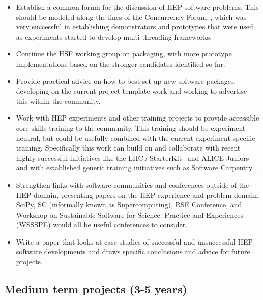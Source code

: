 \documentclass[12pt,a4paper]{article}
\begin{document}
\begin{itemize}
\item
    Establish a common forum for the discussion of HEP software problems.
  This should be modeled along the lines of the Concurrency
  Forum~\cite{ConcurrencyForum}, which was very successful in establishing
  demonstrators and prototypes that were used as experiments started to develop
  multi-threading frameworks.
  \item
  Continue the HSF working group on packaging, with more prototype
  implementations based on the stronger candidates identified so far.
  \item
    Provide practical advice on how to best set up new software packages,
  developing on the current project template work and working to
  advertise this within the community.
  \item
    Work with HEP experiments and other training projects to provide
  accessible core skills training to the community. This training should
  be experiment neutral, but could be usefully combined with the current
  experiment specific training. Specifically this work can build on and
  collaborate with recent highly successful initiatives like the LHCb
  StarterKit~\cite{1742-6596-898-8-082054} and ALICE Juniors~\cite{ALICEJuniors}
  and with established generic training initiatives such as Software
  Carpentry~\cite{SoftwareCarpentry}.
  \item
    Strengthen links with software communities and conferences outside of
  the HEP domain, presenting papers on the HEP experience and problem
  domain. SciPy, SC (informally known as Supercomputing), RSE
  Conference, and Workshop on Sustainable Software for Science: Practice
  and Experiences (WSSSPE) would all be useful conferences to consider.
  \item
    Write a paper that looks at case studies of successful and
  unsuccessful HEP software developments and draws specific conclusions
  and advice for future projects.
\end{itemize}

\hypertarget{medium-term-projects-3-5-years}{%
\subsection{Medium term projects (3-5
years)}\label{medium-term-projects-3-5-years}}
\end{document}
